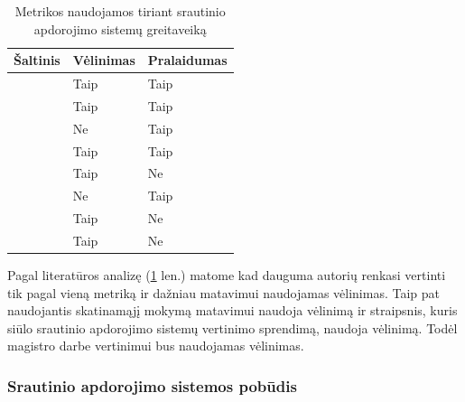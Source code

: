 \documentclass{VUMIFPSbakalaurinis}
\begin{document}
\begin{table}[H]
    \centering
    \begin{tabular}{|l|l|l|}
    \hline
    Šaltinis                 & Vėlinimas                        & Pralaidumas                    \\ \hline
    \cite{stonebraker20058}  & Taip                             & Taip                           \\ \hline
    \cite{Karimov2018BenchmarkingDS} & Taip                     & Taip                           \\ \hline
    \cite{hirzel2014catalog} & Ne                               & Taip                           \\ \hline
    \cite{Qian2016Benchmarking} & Taip                          & Taip                           \\ \hline
    \cite{zhang2020heron}    & Taip                             & Ne                             \\ \hline
    \cite{dhalion}           & Ne                               & Taip                           \\ \hline
    \cite{vaquero2018autotuning} & Taip                         & Ne                             \\ \hline
    \cite{Chintapalli2016Benchmarking} & Taip                   & Ne                             \\ \hline
    \end{tabular}
    \caption{Metrikos naudojamos tiriant srautinio apdorojimo sistemų greitaveiką}
\label{metrikos}
\end{table}

Pagal literatūros analizę (\ref{metrikos} len.) matome kad dauguma autorių renkasi vertinti tik pagal vieną metriką ir dažniau matavimui naudojamas vėlinimas. Taip pat \cite{vaquero2018autotuning} naudojantis skatinamąjį mokymą matavimui naudoja vėlinimą ir \cite{Chintapalli2016Benchmarking} straipsnis, kuris siūlo srautinio apdorojimo sistemų vertinimo sprendimą, naudoja vėlinimą. Todėl magistro darbe vertinimui bus naudojamas vėlinimas.   

\subsubsection{Srautinio apdorojimo sistemos pobūdis}
\end{document}
